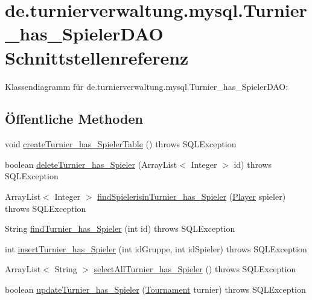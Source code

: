\hypertarget{interfacede_1_1turnierverwaltung_1_1mysql_1_1_turnier__has___spieler_d_a_o}{}\section{de.\+turnierverwaltung.\+mysql.\+Turnier\+\_\+has\+\_\+\+Spieler\+D\+AO Schnittstellenreferenz}
\label{interfacede_1_1turnierverwaltung_1_1mysql_1_1_turnier__has___spieler_d_a_o}


Klassendiagramm für de.\+turnierverwaltung.\+mysql.\+Turnier\+\_\+has\+\_\+\+Spieler\+D\+AO\+:
\subsection*{Öffentliche Methoden}
\begin{DoxyCompactItemize}
\item 
void \hyperlink{interfacede_1_1turnierverwaltung_1_1mysql_1_1_turnier__has___spieler_d_a_o_a547d12487a6020338e9972bfb0322a9d}{create\+Turnier\+\_\+has\+\_\+\+Spieler\+Table} ()  throws S\+Q\+L\+Exception
\item 
boolean \hyperlink{interfacede_1_1turnierverwaltung_1_1mysql_1_1_turnier__has___spieler_d_a_o_a86e99eb3b419ea73a898f0cf9ac60a97}{delete\+Turnier\+\_\+has\+\_\+\+Spieler} (Array\+List$<$ Integer $>$ id)  throws S\+Q\+L\+Exception
\item 
Array\+List$<$ Integer $>$ \hyperlink{interfacede_1_1turnierverwaltung_1_1mysql_1_1_turnier__has___spieler_d_a_o_a0cf9ec53f477980a4fb95242249718ca}{find\+Spielerisin\+Turnier\+\_\+has\+\_\+\+Spieler} (\hyperlink{classde_1_1turnierverwaltung_1_1model_1_1_player}{Player} spieler)  throws S\+Q\+L\+Exception
\item 
String \hyperlink{interfacede_1_1turnierverwaltung_1_1mysql_1_1_turnier__has___spieler_d_a_o_ae4d7394584c8809ae0dbe9105394f494}{find\+Turnier\+\_\+has\+\_\+\+Spieler} (int id)  throws S\+Q\+L\+Exception
\item 
int \hyperlink{interfacede_1_1turnierverwaltung_1_1mysql_1_1_turnier__has___spieler_d_a_o_acf97c80c5c873c094f42a6845cd253c5}{insert\+Turnier\+\_\+has\+\_\+\+Spieler} (int id\+Gruppe, int id\+Spieler)  throws S\+Q\+L\+Exception
\item 
Array\+List$<$ String $>$ \hyperlink{interfacede_1_1turnierverwaltung_1_1mysql_1_1_turnier__has___spieler_d_a_o_ad2d0f846b02112e19c236c27de2468cd}{select\+All\+Turnier\+\_\+has\+\_\+\+Spieler} ()  throws S\+Q\+L\+Exception
\item 
boolean \hyperlink{interfacede_1_1turnierverwaltung_1_1mysql_1_1_turnier__has___spieler_d_a_o_abcc20367c6e7fdf8d853ceb7f0fb2f62}{update\+Turnier\+\_\+has\+\_\+\+Spieler} (\hyperlink{classde_1_1turnierverwaltung_1_1model_1_1_tournament}{Tournament} turnier)  throws S\+Q\+L\+Exception
\end{DoxyCompactItemize}


